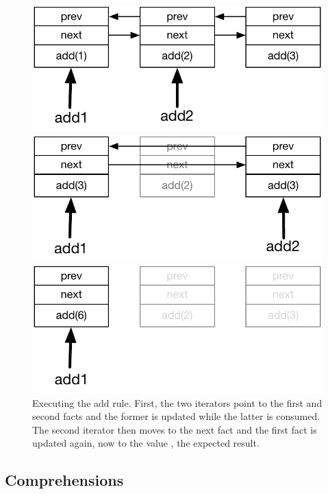 \begin{figure}
\centering
\begin{minipage}{.5\textwidth}
  \centering
  \includegraphics[width=.8\linewidth]{figures/compiler/update}
\end{minipage}%
\begin{minipage}{.5\textwidth}
  \centering
  \includegraphics[width=0.8\linewidth]{figures/compiler/update2}
\end{minipage}
\begin{minipage}{.5\textwidth}
   \centering
   \includegraphics[width=0.8\linewidth]{figures/compiler/update3}
\end{minipage}
\caption{Executing the add rule. First, the two iterators point to
   the first and second facts and the former is updated while the latter is
   consumed. The second iterator then moves to the next fact and the first fact is
   updated again, now to the value , the expected result.}
\label{fig:local:update_add}
\end{figure}

\subsection{Comprehensions}

